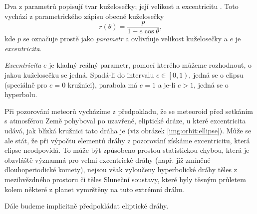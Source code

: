 \medskip

Dva z parametrů popisují tvar kuželosečky; její velikost a excentricitu \cite{astro}. Toto vychází z parametrického zápisu obecné kuželosečky
\begin{equation}
    r(\theta)=\frac{p}{1+e \cos{\theta}}\text{,}
    \label{eqn:orbit:parametric}
\end{equation}
kde $p$ se označuje prostě jako \textit{parametr} a ovlivňuje velikost kuželosečky a $e$ je \textit{excentricita}.

\textit{Excentricita} $e$ je kladný reálný parametr, pomocí kterého můžeme rozhodnout, o jakou kuželosečku se jedná. Spadá-li do intervalu $e\in\left[0,1\right)$, jedná se o elipsu (speciálně pro $e=0$ kružnici), parabola má $e=1$ a je-li $e>1$, jedná se o hyperbolu.

\smallskip

Při pozorování meteorů vycházíme z předpokladu, že se meteoroid před setkáním s atmosférou Země pohyboval po uzavřené, eliptické dráze, u které excentricita udává, jak blízká kružnici tato dráha je (viz obrázek \ref{img:orbit:ellipse}). Může se ale stát, že při výpočtu elementů dráhy z pozorování získáme excentricitu, která elipse neodpovídá. To může být způsobeno prostou statistickou chybou, která je obzvláště významná pro velmi excentrické dráhy (např. již zmíněné dlouhoperiodické komety), nejsou však vyloučeny hyperbolické dráhy těles z mezihvězdného prostoru či těles Sluneční soustavy, které byly těsným průletem kolem některé z planet vymrštěny na tuto extrémní dráhu.

Dále budeme implicitně předpokládat eliptické dráhy.

